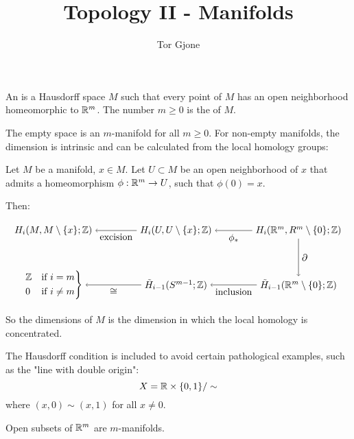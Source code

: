 \documentclass[a4paper,11pt,english]{article}
\title{\textbf{Topology II - Manifolds}}
\author{Tor Gjone}
\begin{document}
\mmaketitle


\begin{defn}
An  is a Hausdorff space $M$ such that every point of $M$ has an open neighborhood homeomorphic to $\mathbb{R}^m$.
The number $m \ge 0$ is the  of $M$.
\end{defn}

\begin{remark}
The empty space is an $m$-manifold for all $m\ge 0$.
For non-empty manifolds, the dimension is intrinsic and can be calculated from the local homology groups:

Let $M$ be a manifold, $x \in M$. Let $U \subset M$ be an open neighborhood of $x$ that admits a homeomorphism $\phi: \mathbb{R}^m \to U$, such that $\phi(0) = x$.

Then:

\[\begin{tikzpicture}[node distance=2cm, auto]
  \node (tl1) {$H_i(M,M\setminus\{x\}; \Z)$};
  \node (tl) [node distance=4.5cm, right of=tl1] {$H_i(U,U\setminus\{x\}; \Z)$};
  \node (tr) [node distance=4.5cm, right of=tl] {$H_i(\R^m,R^m\setminus\{0\}; \Z)$};
  \node (bl1) [below of=tl1] {$\begin{rcases}\Z &\text{if } i=m \\ 0 &\text{if } i\ne m\end{rcases}$};
  \node (bl)  [below of=tl] {$\tilde{H}_{i-1}(S^{m-1}; \Z)$};
  \node (br)  [below of=tr] {$\tilde{H}_{i-1}(\R^{m} \setminus\{0\}; \Z)$};
  \draw[-to] (tl) to node {excision} (tl1);
  \draw[-to] (tr) to node {$\phi_*$} (tl);
  \draw[-to] (tr) to node {$\partial$} (br);
  \draw[-to] (br) to node {inclusion} (bl);
  \draw[-to] (bl) to node {$\cong$} (bl1);
\end{tikzpicture}\]

So the dimensions of $M$ is the dimension in which the local homology is concentrated.
\end{remark}


\begin{remark}
The Hausdorff condition is included to avoid certain pathological examples, such as the "line with double origin":
\[ X = \mathbb{R} \times \{0,1\} / \sim \]
where $(x, 0) \sim (x,1)$ for all $x \ne 0$.
\end{remark}

\begin{exmp}
Open subsets of $\mathbb{R}^m$ are $m$-manifolds.
\end{exmp}
\end{document}
